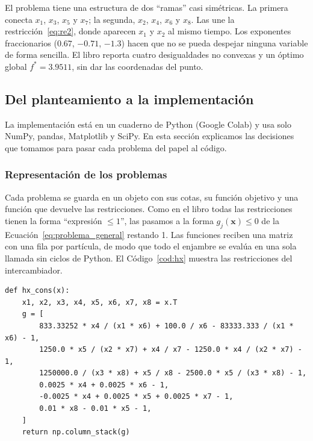El problema tiene una estructura de dos ``ramas'' casi simétricas. La primera conecta $x_1$, $x_3$, $x_5$ y $x_7$; la segunda, $x_2$, $x_4$, $x_6$ y $x_8$. Las une la restricción~\eqref{eq:re2}, donde aparecen $x_1$ y $x_2$ al mismo tiempo. Los exponentes fraccionarios ($0.67$, $-0.71$, $-1.3$) hacen que no se pueda despejar ninguna variable de forma sencilla. El libro reporta cuatro desigualdades no convexas y un óptimo global $f^* = 3.9511$, sin dar las coordenadas del punto.

\subsection{Del planteamiento a la implementación}
\label{sec:implementacion}

La implementación está en un cuaderno de Python (Google Colab) y usa solo NumPy, pandas, Matplotlib y SciPy. En esta sección explicamos las decisiones que tomamos para pasar cada problema del papel al código.

\subsubsection{Representación de los problemas}

Cada problema se guarda en un objeto con sus cotas, su función objetivo y una función que devuelve las restricciones. Como en el libro todas las restricciones tienen la forma ``expresión $\le 1$'', las pasamos a la forma $g_j(\mathbf{x}) \le 0$ de la Ecuación~\eqref{eq:problema_general} restando 1. Las funciones reciben una matriz con una fila por partícula, de modo que todo el enjambre se evalúa en una sola llamada sin ciclos de Python. El Código~\ref{cod:hx} muestra las restricciones del intercambiador.

\begin{lstlisting}[caption={Restricciones del intercambiador de calor en la forma $g_j \le 0$.}, label={cod:hx}]
def hx_cons(x):
    x1, x2, x3, x4, x5, x6, x7, x8 = x.T
    g = [
        833.33252 * x4 / (x1 * x6) + 100.0 / x6 - 83333.333 / (x1 * x6) - 1,
        1250.0 * x5 / (x2 * x7) + x4 / x7 - 1250.0 * x4 / (x2 * x7) - 1,
        1250000.0 / (x3 * x8) + x5 / x8 - 2500.0 * x5 / (x3 * x8) - 1,
        0.0025 * x4 + 0.0025 * x6 - 1,
        -0.0025 * x4 + 0.0025 * x5 + 0.0025 * x7 - 1,
        0.01 * x8 - 0.01 * x5 - 1,
    ]
    return np.column_stack(g)
\end{lstlisting}


